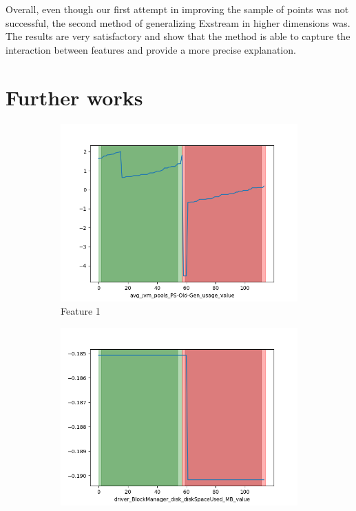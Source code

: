\documentclass[oneside, a4paper, onecolumn, 11pt]{article}
\begin{document}
Overall, even though our first attempt in improving the sample of points was not successful, the second method of generalizing Exstream in higher dimensions was. The results are very satisfactory and show that the method is able to capture the interaction between features and provide a more precise explanation.\\
\section{Further works}
\begin{figure}[H]
  \centering
  \begin{subfigure}{0.30\textwidth}
      \centering
      \includegraphics[width=\linewidth]{images/ex0.png}
      \caption{Feature 1}
  \end{subfigure}
  \begin{subfigure}{0.30\textwidth}
      \centering
      \includegraphics[width=\linewidth]{images/ex1.png}

\end{subfigure}
\end{figure}
\end{document}
